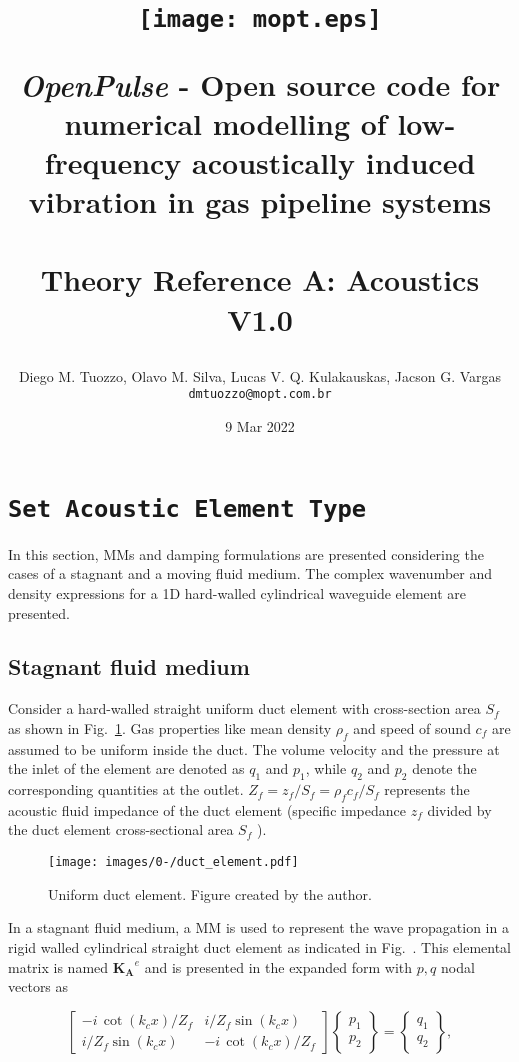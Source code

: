 \documentclass[12pt]{article}
\title{
    \centerline{\texttt{[image: mopt.eps]}}
    \vspace{0.5 cm}
    \textit{OpenPulse} - Open source code for numerical modelling of low-frequency acoustically induced vibration in gas pipeline systems \\
    \hspace{1cm} \\
    \large \textbf{Theory Reference A: Acoustics}\\ 
    \small V1.0
}
\author{
    Diego M. Tuozzo, Olavo M. Silva, Lucas V. Q. Kulakauskas, Jacson G. Vargas\\
    \texttt{dmtuozzo@mopt.com.br}
}
\date{9 Mar 2022}
\begin{document}
\maketitle 

\section{\texttt{Set Acoustic Element Type}}

In this section, \acrfull{MMs} and damping formulations are presented considering the cases of a stagnant and a moving fluid medium. The complex wavenumber and density expressions for a 1D hard-walled cylindrical waveguide element are presented. 

\subsection{Stagnant fluid medium} 

Consider a hard-walled straight uniform duct element with cross-section area $S_f$ as shown in Fig.~\ref{fig:duct_element}. Gas properties like mean density $\rho_f$ and speed of sound $c_f$ are assumed to be uniform inside the duct. The volume velocity and the pressure at the inlet of the element are denoted as $q_1$ and $p_1$, while $q_2$ and $p_2$ denote the corresponding quantities at the outlet. $Z_f= z_f/S_f = \rho_f c_f / S_f$ represents the acoustic fluid impedance of the duct element (specific impedance $z_f$ divided by the duct element cross-sectional area $S_f$ \cite{kinsler2000fundamentals}).

\begin{figure}[ht!]
	\centering
	\texttt{[image: images/0-/duct\_element.pdf]}
	\caption{Uniform duct element. Figure created by the author.}
	\label{fig:duct_element}
\end{figure}

In a stagnant fluid medium, a \acrfull{MM} is used to represent the wave propagation in a rigid walled cylindrical straight duct element as indicated in Fig.~\label{fig:duct_element}. This elemental matrix is named $\mathbf{K_{\text{A}}}^e$ and is presented in the expanded form with $p, q$ nodal vectors as

\begin{equation} \label{eq:mmm_element_expand}
	\begin{bmatrix}
		- i \, \cot(k_c x)/Z_{f} & i / Z_{f} \sin(k_c x) \\
		i / Z_{f} \sin(k_c x) & -i \, \cot(k_c x) / Z_{f}
	\end{bmatrix}
	\begin{Bmatrix}
		p_1 \\
		p_2
	\end{Bmatrix}
	=
	\begin{Bmatrix}
		q_1 \\
		q_2
	\end{Bmatrix}, 
\end{equation}
\end{document}
